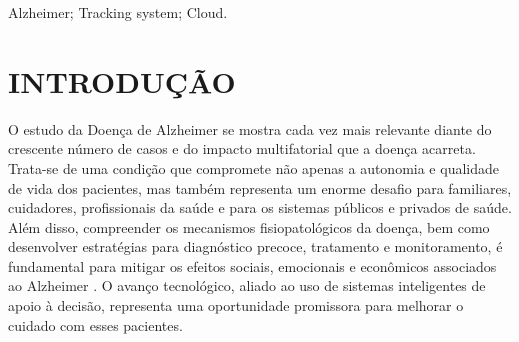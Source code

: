 \documentclass[conference,a4paper,10pt]{IEEETran}
\begin{document}
\begin{abstract}
Alzheimer's disease represents a growing challenge for global health systems and families, given its slow progression and significant impact on patient autonomy. The variability in cognitive deterioration requires continuous and detailed monitoring, which is often difficult to achieve with traditional methods, increasing caregiver stress and compromising patient safety. The general objective of this work was to develop an integrated follow-up system for people with Alzheimer's, aiming to improve monitoring, communication between doctors, patients, and caregivers, and treatment management through a technological solution. The project consists of a web platform and a mobile application that centralize the flow of information, allowing for the registration of exams, direct communication, clinical organization via a dashboard, and the addition of conclusions as the treatment progresses. Specifically, the web platform allows the medical team to manage patients and view their complete history, while the mobile application facilitates the submission of results and immediate contact via chat for patients and caregivers. The development methodology adopted was Scrum, organized into Sprints that ensured incremental product deliveries. The system architecture was implemented on the Microsoft Azure cloud, using technologies such as React and React Native for the interfaces, and Java with Spring Boot for the API construction, ensuring a robust, scalable, and secure solution. As a result, the system offers an effective tool to optimize care, promote rapid intervention, and improve the quality of life for those involved in the treatment of Alzheimer's disease.
\end{abstract}

\begin{keywords}
Alzheimer; Tracking system; Cloud.
\end{keywords}



\section{INTRODUÇÃO}

O estudo da Doença de Alzheimer se mostra cada vez mais relevante diante do crescente número de casos e do impacto multifatorial que a doença acarreta. Trata-se de uma condição que compromete não apenas a autonomia e qualidade de vida dos pacientes, mas também representa um enorme desafio para familiares, cuidadores, profissionais da saúde e para os sistemas públicos e privados de saúde. Além disso, compreender os mecanismos fisiopatológicos da doença, bem como desenvolver estratégias para diagnóstico precoce, tratamento e monitoramento, é fundamental para mitigar os efeitos sociais, emocionais e econômicos associados ao Alzheimer \cite{Scheltens2021Alzheimer}. O avanço tecnológico, aliado ao uso de sistemas inteligentes de apoio à decisão, representa uma oportunidade promissora para melhorar o cuidado com esses pacientes.
\end{document}
